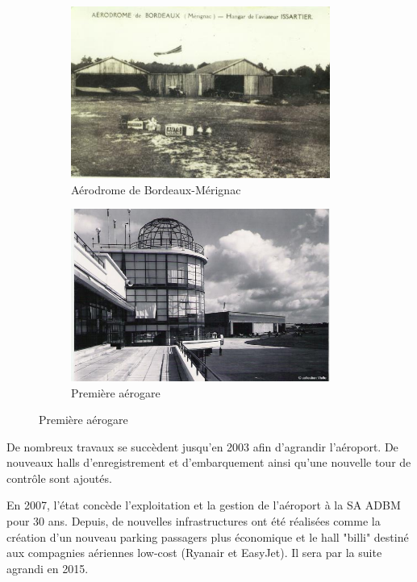 \begin{figure}[hbt!]
    \begin{subfigure}{0.5\textwidth}
      \centering
      \includegraphics[width=8.5cm]{Images/premier.jpg}  
      \caption{Aérodrome de Bordeaux-Mérignac}
      \label{fig:aérodrome}
    \end{subfigure}
    \begin{subfigure}{0.5\textwidth}
      \centering
      \includegraphics[width=8.5cm]{Images/premiere_aerogare.jpg}  
      \caption{Première aérogare}
      \label{fig:premiereAerogare}
    \end{subfigure}
\end{figure}


\newpage

De nombreux travaux se succèdent jusqu'en 2003 afin d'agrandir l'aéroport. De nouveaux halls d'enregistrement et d'embarquement ainsi qu'une nouvelle tour de contrôle sont ajoutés.

En 2007, l'état concède l'exploitation et la gestion de l'aéroport à la SA ADBM pour 30 ans. Depuis, de nouvelles infrastructures ont été réalisées comme la création d'un nouveau parking passagers plus économique et le hall "billi" destiné aux compagnies aériennes low-cost (Ryanair et EasyJet). Il sera par la suite agrandi en 2015.\newline

